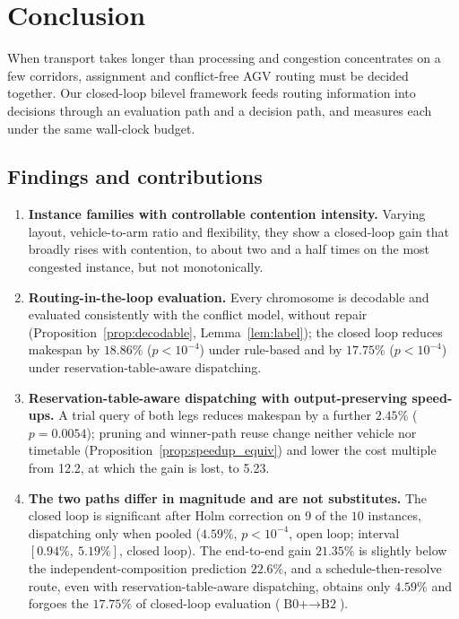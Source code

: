 \documentclass[preprint,review,12pt,authoryear,doubleblind]{elsarticle}
\newcommand{\NCases}{10}
\newcommand{\GainLoopRule}{18.86\%}      %
\newcommand{\PLoopRule}{<10^{-4}}
\newcommand{\GainLoopProbe}{17.75\%}     %
\newcommand{\PLoopProbe}{<10^{-4}}
\newcommand{\GainProbeOpen}{4.59\%}      %
\newcommand{\PProbeOpen}{<10^{-4}}
\newcommand{\GainProbeLoop}{2.45\%}      %
\newcommand{\PProbeLoop}{=0.0054}
\newcommand{\GainEndToEnd}{21.35\%}      %
\newcommand{\CIProbeLoop}{$[0.94\%,\ 5.19\%]$}
\newcommand{\GainIndepProduct}{22.6\%}
\newcommand{\CellsSigLoopAdj}{9}
\newcommand{\CostMultBefore}{12.2}
\newcommand{\CostMultAfter}{5.23}
\begin{document}



\section{Conclusion}

When transport takes longer than processing and congestion concentrates on a few corridors, assignment and conflict-free AGV routing must be decided together. Our closed-loop bilevel framework feeds routing information into decisions through an evaluation path and a decision path, and measures each under the same wall-clock budget.

\subsection{Findings and contributions}
\label{sec:contributions}

\begin{enumerate}[leftmargin=*,topsep=2pt,itemsep=2pt]
\item \textbf{Instance families with controllable contention intensity.} Varying layout, vehicle-to-arm ratio and flexibility, they show a closed-loop gain that broadly rises with contention, to about two and a half times on the most congested instance, but not monotonically.
\item \textbf{Routing-in-the-loop evaluation.} Every chromosome is decodable and evaluated consistently with the conflict model, without repair (Proposition~\ref{prop:decodable}, Lemma~\ref{lem:label}); the closed loop reduces makespan by $\GainLoopRule$ ($p\PLoopRule$) under rule-based and by $\GainLoopProbe$ ($p\PLoopProbe$) under reservation-table-aware dispatching.
\item \textbf{Reservation-table-aware dispatching with output-preserving speed-ups.} A trial query of both legs reduces makespan by a further $\GainProbeLoop$ ($p\PProbeLoop$); pruning and winner-path reuse change neither vehicle nor timetable (Proposition~\ref{prop:speedup_equiv}) and lower the cost multiple from \CostMultBefore{}, at which the gain is lost, to \CostMultAfter{}.
\item \textbf{The two paths differ in magnitude and are not substitutes.} The closed loop is significant after Holm correction on \CellsSigLoopAdj{} of the $\NCases$ instances, dispatching only when pooled ($\GainProbeOpen$, $p\PProbeOpen$, open loop; interval \CIProbeLoop{}, closed loop). The end-to-end gain $\GainEndToEnd$ is slightly below the independent-composition prediction $\GainIndepProduct$, and a schedule-then-resolve route, even with reservation-table-aware dispatching, obtains only $\GainProbeOpen$ and forgoes the $\GainLoopProbe$ of closed-loop evaluation ($\text{B0+}\to\text{B2}$).
\end{enumerate}
\end{document}

